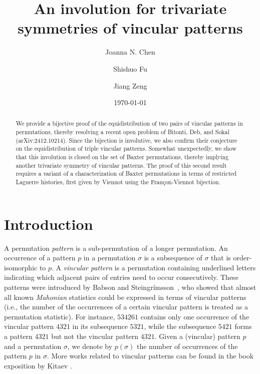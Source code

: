 \documentclass[12pt,reqno]{amsart}
\title[]{An involution for trivariate symmetries of vincular patterns}
\author[J.~N.~Chen]{Joanna N. Chen}
\author[S.~Fu]{Shishuo Fu}
\author[J.~Zeng]{Jiang Zeng}
\date{\today}
\numberwithin{equation}{section}
\theoremstyle{plain}
\theoremstyle{definition}
\begin{document}
\begin{abstract}
We provide a bijective proof of the equidistribution of two pairs of vincular patterns in permutations, thereby resolving a recent open problem of Bitonti, Deb, and Sokal (arXiv:2412.10214). Since the bijection is involutive, we also confirm their conjecture on the equidistribution of triple vincular patterns. Somewhat unexpectedly, we show that this involution is closed on the set of Baxter permutations, thereby implying another trivariate symmetry of vincular patterns. The proof of this second result requires a variant of a characterization of Baxter permutations in terms of restricted Laguerre histories, first given by Viennot using the Fran\c con-Viennot bijection.
\end{abstract}



\maketitle




\section{Introduction}

A  permutation {\it pattern} is a sub-permutation of a longer permutation.
An occurrence of a pattern $p$ in a permutation $\sigma$ is a subsequence of $\sigma$ that is order-isomorphic to $p$. 
 A {\it vincular pattern} is a permutation containing underlined letters  indicating which adjacent pairs of entries need to occur consecutively. These patterns were introduced by Babson and Steingr\'{i}msson~\cite{BS00}, who showed that almost all known \emph{Mahonian} statistics could be expressed in terms of vincular patterns (i.e., the number of the occurrences of a certain vincular pattern is treated as a permutation statistic). For instance, $534261$ contains only one occurrence of the vincular pattern $\underline{43}21$ in its subsequence $5321$, while the subsequence $5421$ forms a pattern $4321$ but not the vincular pattern $\underline{43}21$. Given a (vincular) pattern $p$ and a permutation $\sigma$, we denote by $p(\sigma)$ the number of occurrences of the pattern $p$ in $\sigma$.
 More works related to vincular patterns can be found in the book exposition by Kitaev \cite[Chapter 7]{Kit11}.
\end{document}
